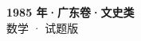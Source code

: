 \documentclass[zihao=-4, a4paper]{ctexart}
\begin{document}
\begin{center}
  {\Large\bfseries 1985 年·广东卷·文史类}\\[4pt]
  {\large 数学 · 试题版}
\end{center}
\medskip
{}

\end{document}
